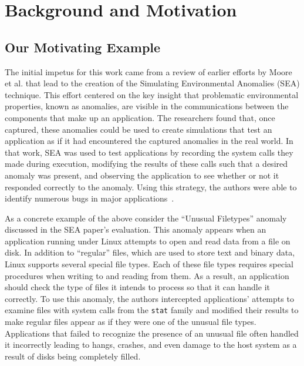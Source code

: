 \section{Background and Motivation}
\label{SEC:background}


\subsection{Our Motivating Example}
\label{sec:MotivatingExample}

The initial impetus for this work came from a review
of earlier efforts by Moore et al.
that lead to the creation of
the Simulating Environmental Anomalies (SEA) technique.
This effort centered on the key insight
that problematic
environmental properties,
known as anomalies, are visible in the
communications between the components that make up an application.
The researchers found that,
once captured,
these anomalies
could be
used to create simulations
that test
an application as if
it had encountered the captured anomalies
in the real world.
In that work, SEA was used to test applications
by recording the system calls they made
during execution,
modifying the results of these calls such that a desired anomaly
was present,
and observing the application to see whether or not it
responded correctly to the anomaly.
Using this strategy, the authors were able to identify numerous bugs
in major applications~\cite{DBLP:conf/issre/MooreCFW19}.

As a concrete example of the above
consider the ``Unusual Filetypes'' anomaly
discussed in the SEA paper's evaluation.
This anomaly appears
when an application running under Linux
attempts to open and read data from a file on disk.
In addition to ``regular'' files,
which are used to store text and
binary data,
Linux supports several special file types.
Each of these file types requires special procedures when writing to and
reading from them.
As a result, an application should check the type of files it intends to
process so that it can handle it correctly.
To use this anomaly, the authors intercepted applications' attempts to
examine files with system calls from the {\tt stat} family and modified
their results to make regular files appear as if they were one of the
unusual file types.
Applications that failed to recognize the presence of
an unusual file often handled it incorrectly leading to hangs,
crashes, and even damage to the host system as a result of disks being
completely filled.

